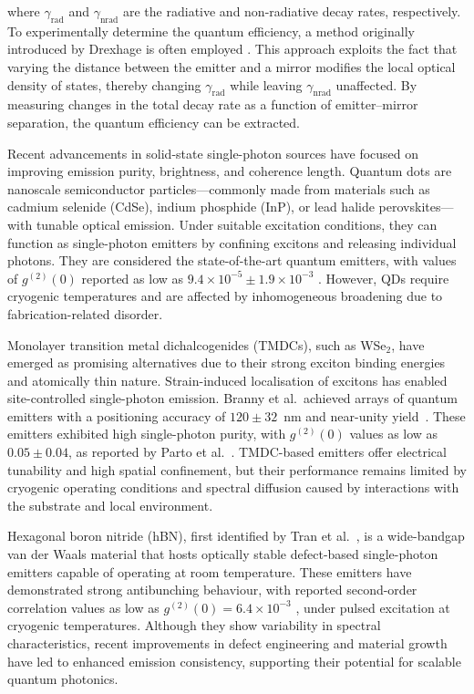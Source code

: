 where $\gamma_{\mathrm{rad}}$ and $\gamma_{\mathrm{nrad}}$ are the radiative and non-radiative decay rates, respectively. To experimentally determine the quantum efficiency, a method originally introduced by Drexhage is often employed \cite{Tews1970, Drexhage1968}. This approach exploits the fact that varying the distance between the emitter and a mirror modifies the local optical density of states, thereby changing $\gamma_{\mathrm{rad}}$ while leaving $\gamma_{\mathrm{nrad}}$ unaffected. By measuring changes in the total decay rate as a function of emitter–mirror separation, the quantum efficiency can be extracted.

Recent advancements in solid-state single-photon sources have focused on improving emission purity, brightness, and coherence length. Quantum dots are nanoscale semiconductor particles—commonly made from materials such as cadmium selenide (CdSe), indium phosphide (InP), or lead halide perovskites—with tunable optical emission. Under suitable excitation conditions, they can function as single-photon emitters by confining excitons and releasing individual photons. They are considered the state-of-the-art quantum emitters, with values of $g^{(2)}(0)$ reported as low as $9.4\times 10^{-5}\pm 1.9\times 10^{-3}$ \cite{Hanschke2018}. However, QDs require cryogenic temperatures and are affected by inhomogeneous broadening due to fabrication-related disorder.

Monolayer transition metal dichalcogenides (TMDCs), such as WSe$_2$, have emerged as promising alternatives due to their strong exciton binding energies and atomically thin nature. Strain-induced localisation of excitons has enabled site-controlled single-photon emission. Branny et al.\ achieved arrays of quantum emitters with a positioning accuracy of $120 \pm 32$~nm and near-unity yield~\cite{Branny2017}. These emitters exhibited high single-photon purity, with $g^{(2)}(0)$ values as low as $0.05\pm0.04$, as reported by Parto et al.~\cite{Parto2021}. TMDC-based emitters offer electrical tunability and high spatial confinement, but their performance remains limited by cryogenic operating conditions and spectral diffusion caused by interactions with the substrate and local environment.

Hexagonal boron nitride (hBN), first identified by Tran et al.~\cite{Tran2016}, is a wide-bandgap van der Waals material that hosts optically stable defect-based single-photon emitters capable of operating at room temperature. These emitters have demonstrated strong antibunching behaviour, with reported second-order correlation values as low as $g^{(2)}(0) = 6.4\times10^{-3}$ \cite{Vogl2021}, under pulsed excitation at cryogenic temperatures. Although they show variability in spectral characteristics, recent improvements in defect engineering and material growth have led to enhanced emission consistency, supporting their potential for scalable quantum photonics.



